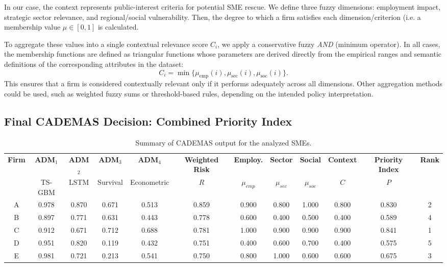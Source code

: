 \documentclass[letterpaper, 10 pt,conference]{IEEEconf}
\begin{document}
In our case, the context represents public-interest criteria for potential SME rescue. We define three fuzzy dimensions: employment impact, strategic sector relevance, and regional/social vulnerability. 
Then, the degree to which a firm satisfies each dimension/criterion (i.e. a membership value \(\mu \in [0,1]\) is calculated.

To aggregate these values into a single contextual relevance score $C_i$, we apply a conservative fuzzy \textit{AND} (minimum operator). In all cases, the membership functions are defined as triangular functions whose parameters are derived directly from the empirical ranges and semantic definitions of the corresponding attributes in the dataset:
\begin{equation*}
    C_i = \min\{\mu_\text{emp}(i), \mu_\text{sec}(i), \mu_\text{soc}(i)\}.
\end{equation*}
\noindent
This ensures that a firm is considered contextually relevant only if it performs adequately across all dimensions. Other aggregation methods could be used, such as weighted fuzzy sums or threshold-based rules, depending on the intended policy interpretation.


\subsection{Final CADEMAS Decision: Combined Priority Index}

\begin{table}[tb]
\centering

\caption{Summary of CADEMAS output for the analyzed SMEs.}
\renewcommand{\arraystretch}{1.3}
\label{tab:cade_example}
\begin{tabular}{|c|c|c|c|c|c||c|c|c|c||c|c|}
\hline
\textbf{Firm} & \textbf{ADM$_1$} & \textbf{ADM$_2$} & \textbf{ADM$_3$} & \textbf{ADM$_4$} & \textbf{Weighted Risk} & 
\textbf{Employ.} & \textbf{Sector} & \textbf{Social} & \textbf{Context} & 
\textbf{Priority Index} & \textbf{Rank} \\
 & TS-GBM & LSTM & Survival & Econometric & \(R\) & \(\mu_{emp}\) & \(\mu_{sec}\) & \(\mu_{soc}\) & \(C\) & \(P\) & \\
\hline
A & 0.978 & 0.870 & 0.671 & 0.513 & 0.859 & 0.900 & 0.800 & 1.000 & 0.800 & 0.830 & 2 \\
B & 0.897 & 0.771 & 0.631 & 0.443 & 0.778 & 0.600 & 0.400 & 0.500 & 0.400 & 0.589 & 4 \\
C & 0.912 & 0.671 & 0.712 & 0.688 & 0.781 & 1.000 & 0.900 & 0.900 & 0.900 & 0.841 & 1 \\
D & 0.951 & 0.820 & 0.119 & 0.432 & 0.751 & 0.400 & 0.600 & 0.700 & 0.400 & 0.575 & 5 \\
E & 0.981 & 0.721 & 0.213 & 0.541 & 0.750 & 0.800 & 1.000 & 0.600 & 0.600 & 0.675 & 3 \\
\hline
\end{tabular}
\end{table}
\end{document}
